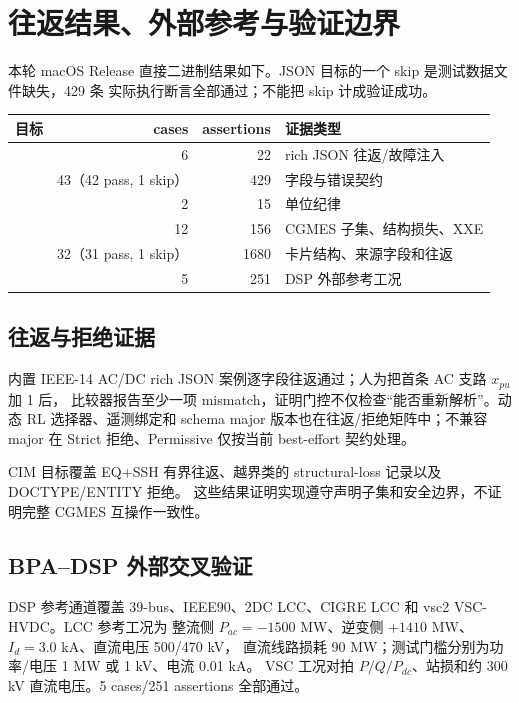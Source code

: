 \section{往返结果、外部参考与验证边界}\label{sec:io-numerical}

本轮 macOS Release 直接二进制结果如下。JSON 目标的一个 skip 是测试数据文件缺失，429 条
实际执行断言全部通过；不能把 skip 计成验证成功。
\begin{center}\small
\begin{tabular}{@{}L{6.1cm}rrL{4.2cm}@{}}
\toprule 目标 & cases & assertions & 证据类型\\\midrule
{} & 6 & 22 & rich JSON 往返/故障注入\\
 & 43（42 pass, 1 skip） & 429 & 字段与错误契约\\
 & 2 & 15 & 单位纪律\\
 & 12 & 156 & CGMES 子集、结构损失、XXE\\
 & 32（31 pass, 1 skip） & 1680 & 卡片结构、来源字段和往返\\
 & 5 & 251 & DSP 外部参考工况\\
\bottomrule
\end{tabular}
\end{center}

\subsection{往返与拒绝证据}
内置 IEEE-14 AC/DC rich JSON 案例逐字段往返通过；人为把首条 AC 支路 $x_{pu}$ 加 1 后，
比较器报告至少一项 mismatch，证明门控不仅检查“能否重新解析”。动态 RL 选择器、遥测绑定和
schema major 版本也在往返/拒绝矩阵中；不兼容 major 在 Strict 拒绝、Permissive 仅按当前
best-effort 契约处理。

CIM 目标覆盖 EQ+SSH 有界往返、越界类的 structural-loss 记录以及 DOCTYPE/ENTITY 拒绝。
这些结果证明实现遵守声明子集和安全边界，不证明完整 CGMES 互操作一致性。

\subsection{BPA--DSP 外部交叉验证}
DSP 参考通道覆盖 39-bus、IEEE90、2DC LCC、CIGRE LCC 和 vsc2 VSC-HVDC。LCC 参考工况为
整流侧 $P_{ac}=-1500$ MW、逆变侧 $+1410$ MW、$I_d=3.0$ kA、直流电压 500/470 kV，
直流线路损耗 90 MW；测试门槛分别为功率/电压 1 MW 或 1 kV、电流 0.01 kA。
VSC 工况对拍 $P/Q/P_{dc}$、站损和约 300 kV 直流电压。5 cases/251 assertions 全部通过。

